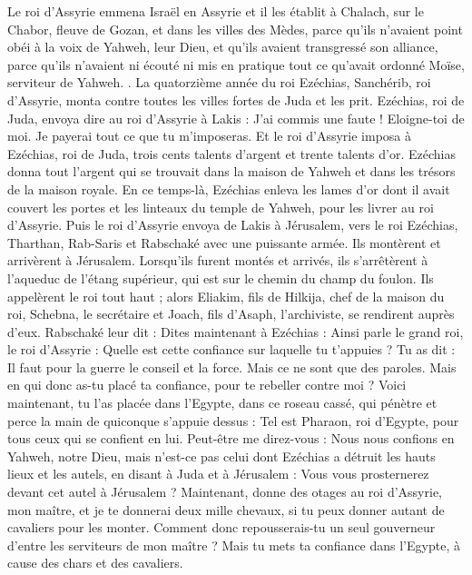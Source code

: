 \begin{multicols}{2}
Le roi d'Assyrie emmena Israël en Assyrie et il les établit à Chalach, sur le Chabor, fleuve de Gozan, et dans les villes des Mèdes,
parce qu'ils n'avaient point obéi à la voix de Yahweh, leur Dieu, et qu'ils avaient transgressé son alliance, parce qu'ils n'avaient ni écouté ni mis en pratique tout ce qu'avait ordonné Moïse, serviteur de Yahweh.
.
La quatorzième année du roi Ezéchias, Sanchérib, roi d'Assyrie, monta contre toutes les villes fortes de Juda et les prit.
Ezéchias, roi de Juda, envoya dire au roi d'Assyrie à Lakis : J'ai commis une faute ! Eloigne-toi de moi. Je payerai tout ce que tu m'imposeras. Et le roi d'Assyrie imposa à Ezéchias, roi de Juda, trois cents talents d'argent et trente talents d'or.
Ezéchias donna tout l'argent qui se trouvait dans la maison de Yahweh et dans les trésors de la maison royale.
En ce temps-là, Ezéchias enleva les lames d'or dont il avait couvert les portes et les linteaux du temple de Yahweh, pour les livrer au roi d'Assyrie.
Puis le roi d'Assyrie envoya de Lakis à Jérusalem, vers le roi Ezéchias, Tharthan, Rab-Saris et Rabschaké avec une puissante armée. Ils montèrent et arrivèrent à Jérusalem. Lorsqu'ils furent montés et arrivés, ils s'arrêtèrent à l'aqueduc de l'étang supérieur, qui est sur le chemin du champ du foulon.
Ils appelèrent le roi tout haut ; alors Eliakim, fils de Hilkija, chef de la maison du roi, Schebna, le secrétaire et Joach, fils d'Asaph, l'archiviste, se rendirent auprès d'eux.
Rabschaké leur dit : Dites maintenant à Ezéchias : Ainsi parle le grand roi, le roi d'Assyrie : Quelle est cette confiance sur laquelle tu t'appuies ?
Tu as dit : Il faut pour la guerre le conseil et la force. Mais ce ne sont que des paroles. Mais en qui donc as-tu placé ta confiance, pour te rebeller contre moi ?
Voici maintenant, tu l'as placée dans l'Egypte, dans ce roseau cassé, qui pénètre et perce la main de quiconque s'appuie dessus : Tel est Pharaon, roi d'Egypte, pour tous ceux qui se confient en lui.
Peut-être me direz-vous : Nous nous confions en Yahweh, notre Dieu, mais n'est-ce pas celui dont Ezéchias a détruit les hauts lieux et les autels, en disant à Juda et à Jérusalem : Vous vous prosternerez devant cet autel à Jérusalem ?
Maintenant, donne des otages au roi d'Assyrie, mon maître, et je te donnerai deux mille chevaux, si tu peux donner autant de cavaliers pour les monter.
Comment donc repousserais-tu un seul gouverneur d'entre les serviteurs de mon maître ? Mais tu mets ta confiance dans l'Egypte, à cause des chars et des cavaliers.

\end{multicols}
